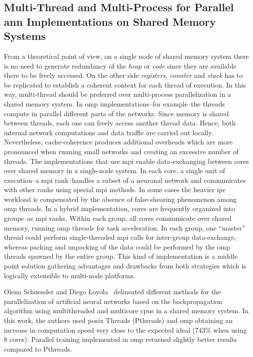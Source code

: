 {\subsection{Multi-Thread and Multi-Process for Parallel \gls{ann} Implementations on Shared Memory Systems}

From a theoretical point of view, on a single node of shared memory system there is no need to generate redundancy of the \emph{heap} or \emph{code} since they are available there to be freely accessed. On the other side \emph{registers}, \emph{counter} and \emph{stack} has to be replicated to establish a coherent context for each thread of execution. In this way, multi-thread should be preferred over multi-process parallelization in a shared memory system. In \gls{omp} implementations--for example--the threads compute in parallel different parts of the networks. Since memory is shared between threads, each one can freely access another thread data. Hence, both internal network computations and data traffic are carried out locally. Nevertheless, cache-coherence produces additional overheads which are more pronounced when running small networks and creating an excessive number of threads. The implementations that use \gls{mpi} enable data-exchanging between cores over shared memory in a single-node system. In each core, a single unit of execution--a \gls{mpi} rank--handles a subset of a neuronal network and communicates with other ranks using special \gls{mpi} methods. In some cases the heavier \gls{ipc} workload is compensated by the absence of false-shearing phenomenon among \gls{omp} threads. In a hybrid implementation, cores are frequently organized into groups--as \gls{mpi} ranks. Within each group, all cores communicate over shared memory, running \gls{omp} threads for task acceleration. In each group, one “master” thread could perform single-threaded \gls{mpi} calls for inter-group data-exchange, whereas packing and unpacking of the data could be performed by the \gls{omp} threads spawned by the entire group. This kind of implementation is a middle point solution gathering advantages and drawbacks from both strategies which is logically extensible to multi-node platforms.

Olena Schuessler and Diego Loyola~\cite{Schuessler:2011:PTA:1997052.1997062} delineated different methods for the parallelization of artificial neural networks based on the backpropagation algorithm using multithreaded and multicore \glspl{cpu} in a shared memory system. In this work, the authors used \gls{posix} Threads (Pthreads) and \gls{omp} obtaining an increase in computation speed very close to the expected ideal (743\% when using 8 cores). Parallel training implemented in \gls{omp} returned slightly better results compared to Pthreads.

}
